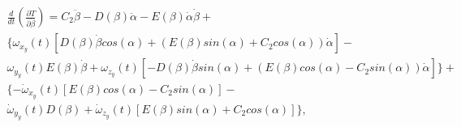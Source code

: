\begin{equation}%
\label{eq:p3:44+}
\begin{multlined}
\frac{d}{d t}\left( \frac{ \partial T}{ \partial \dot \beta}\right) = 
C_2 \ddot{\beta} - 
D(\beta) \ddot{\alpha} - 
E(\beta)\dot{\alpha}\dot{\beta}+
\\
\{ 
	\omega_{x_y} (t) \left[ D(\beta) \dot{\beta} cos(\alpha) + ( E(\beta)sin(\alpha) + C_2 cos(\alpha) )\dot{\alpha}\right] -\\
	\omega_{y_y} (t) E(\beta)\dot{\beta}+
	\omega_{z_y} (t) \left[ 
		-D(\beta)\dot{\beta}sin(\alpha)
		+(
			E(\beta)cos(\alpha)
			-C_2 sin(\alpha)
		)\dot{\alpha}
	\right]
\}
+\\
\{
-\dot{\omega}_{x_y} (t) \left[ E(\beta)cos(\alpha) - C_2 sin(\alpha) \right] 
-\\\dot{\omega}_{y_y} (t) D(\beta)
+\dot{\omega}_{z_y} (t) \left[ E(\beta)sin(\alpha) + C_2 cos(\alpha)\right] 
\}
,
\end{multlined}
\end{equation}


